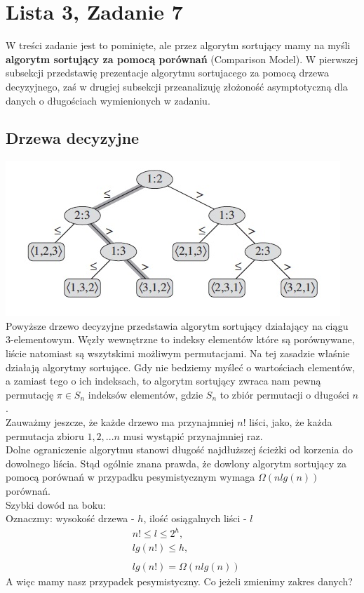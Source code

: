 \documentclass{article}
\begin{document}
\section{Lista 3, Zadanie 7}
W treści zadanie jest to pominięte, ale przez algorytm sortujący mamy na myśli \textbf{algorytm sortujący za pomocą porównań} (Comparison Model). W pierwszej subsekcji przedstawię prezentacje algorytmu sortujacego za pomocą drzewa decyzyjnego, zaś w drugiej subsekcji przeanalizuję złożoność asymptotyczną dla danych o długościach wymienionych w zadaniu.\\

\subsection{Drzewa decyzyjne}
\includegraphics[scale=0.7]{tree}\\
Powyższe drzewo decyzyjne przedstawia algorytm sortujący działający na ciągu 3-elementowym. Węzły wewnętrzne to indeksy elementów które są porównywane, liście natomiast są wszytskimi możliwym permutacjami. Na tej zasadzie właśnie działają algorytmy sortujące. Gdy nie bedziemy myśleć o wartościach elementów, a zamiast tego o ich indeksach, to algorytm sortujący zwraca nam pewną permutację $\pi \in S_n$ indeksów elementów, gdzie $S_n$ to zbiór permutacji o długości $n$.\\
Zauważmy jeszcze, że każde drzewo ma przynajmniej $n!$ liści, jako, że każda permutacja zbioru ${1,2, ... n}$ musi wystąpić przynajmniej raz.\\
Dolne ograniczenie algorytmu stanowi długość najdłuższej ścieżki od korzenia do dowolnego liścia. Stąd ogólnie znana prawda, że dowlony algorytm sortujący za pomocą porównań w przypadku pesymistycznym wymaga $\Omega (nlg(n))$ porównań.\\
Szybki dowód na boku:\\
Oznaczmy: wysokość drzewa - $h$, ilość osiągalnych liści - $l$
\begin{align*}
&n! \leq l \leq 2^h,\\
&lg(n!) \leq h,\\
\\
&lg(n!) = \Omega (nlg(n))
\end{align*}
A więc mamy nasz przypadek pesymistyczny. Co jeżeli zmienimy zakres danych?
\end{document}
